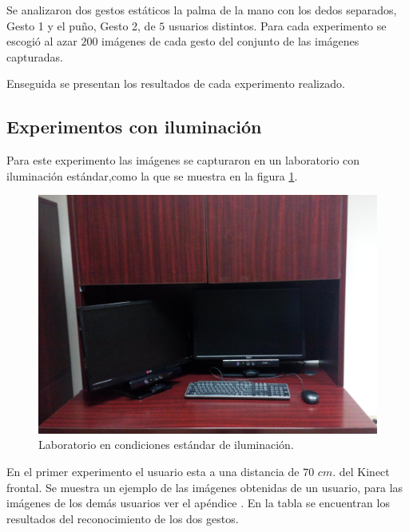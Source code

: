 Se analizaron dos gestos estáticos la palma de la mano con los dedos separados, Gesto 1 y el puño, Gesto 2, de $5$ usuarios distintos. Para cada experimento se escogió al azar $200$ imágenes de cada gesto del conjunto de las imágenes capturadas. 

Enseguida se presentan los resultados de cada experimento realizado.

\subsection{Experimentos con iluminación} 
Para este experimento las imágenes se capturaron en un laboratorio con iluminación estándar,como la que se muestra en la figura \ref{fig:LabIluminado}.

\begin{figure}[h!]
\begin{center} 
\includegraphics[scale=0.09]{./Figures/iluminacion.jpg}
\end{center}
\caption{Laboratorio en condiciones estándar de iluminación.}
\label{fig:LabIluminado}
\end{figure} 

En el primer experimento el usuario esta a una distancia de $70$ $cm.$ del Kinect frontal. Se muestra un ejemplo de las imágenes obtenidas de un usuario, para las imágenes de los demás usuarios ver el apéndice . En la tabla se encuentran los resultados del reconocimiento de los dos gestos.  

